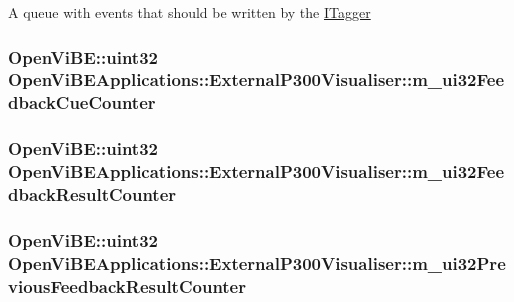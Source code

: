 \label{classOpenViBEApplications_1_1ExternalP300Visualiser_a04a821adef1b94191723146578ae3669}
A queue with events that should be written by the \hyperlink{classOpenViBEApplications_1_1ITagger}{ITagger} \hypertarget{classOpenViBEApplications_1_1ExternalP300Visualiser_ad6e2d7401659d373523480531da643fa}{
\subsubsection[{m\_\-ui32FeedbackCueCounter}]{\setlength{\rightskip}{0pt plus 5cm}OpenViBE::uint32 {\bf OpenViBEApplications::ExternalP300Visualiser::m\_\-ui32FeedbackCueCounter}}}
\label{classOpenViBEApplications_1_1ExternalP300Visualiser_ad6e2d7401659d373523480531da643fa}
\hypertarget{classOpenViBEApplications_1_1ExternalP300Visualiser_aa6239b87146df722ad2c69e3e25fb994}{
\subsubsection[{m\_\-ui32FeedbackResultCounter}]{\setlength{\rightskip}{0pt plus 5cm}OpenViBE::uint32 {\bf OpenViBEApplications::ExternalP300Visualiser::m\_\-ui32FeedbackResultCounter}}}
\label{classOpenViBEApplications_1_1ExternalP300Visualiser_aa6239b87146df722ad2c69e3e25fb994}
\hypertarget{classOpenViBEApplications_1_1ExternalP300Visualiser_a495ce12b0d23b6e6262e067557946375}{
\subsubsection[{m\_\-ui32PreviousFeedbackResultCounter}]{\setlength{\rightskip}{0pt plus 5cm}OpenViBE::uint32 {\bf OpenViBEApplications::ExternalP300Visualiser::m\_\-ui32PreviousFeedbackResultCounter}}}
\label{classOpenViBEApplications_1_1ExternalP300Visualiser_a495ce12b0d23b6e6262e067557946375}


